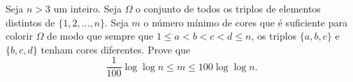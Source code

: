 Seja \(n>3\) um inteiro. Seja \(\Omega\) o conjunto de todos os triplos de elementos distintos de \(\{1,2,\ldots,n\}\). Seja \(m\) o número mínimo de cores que é suficiente para colorir \(\Omega\) de modo que sempre que \(1\le a<b<c<d\le n\), os triplos \(\{a,b,c\}\) e \(\{b,c,d\}\) tenham cores diferentes. Prove que
\[
\frac{1}{100}\log\log n \le m \le 100\log\log n.
\]
